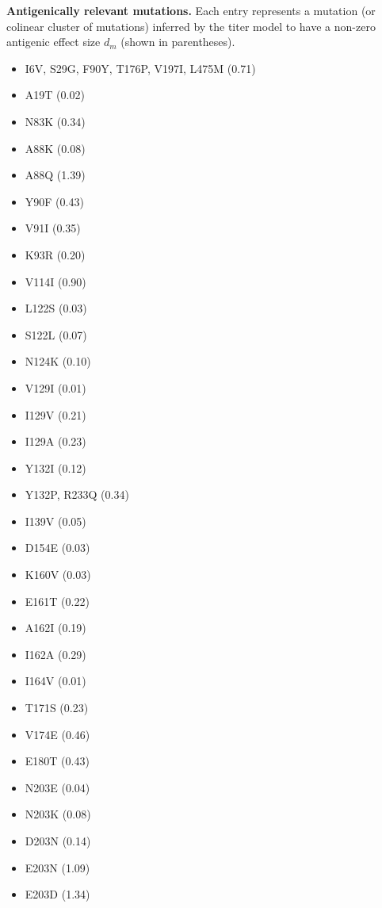 \documentclass[11pt,oneside,letterpaper]{article}
\begin{document}
\begin{table}[ht]
  \centering
  \caption{
    \textbf{Antigenically relevant mutations.}
    Each entry represents a mutation (or colinear cluster of mutations) inferred by the titer model to have a non-zero antigenic effect size $d_m$ (shown in parentheses).
  }
  \label{antigenic_mutations}
  \begin{multicols}{3}
    \begin{itemize}
      \raggedright
      \item I6V, S29G, F90Y, T176P, V197I, L475M (0.71)
      \item A19T (0.02)
      \item N83K (0.34)
      \item A88K (0.08)
      \item A88Q (1.39)
      \item Y90F (0.43)
      \item V91I (0.35)
      \item K93R (0.20)
      \item V114I (0.90)
      \item L122S (0.03)
      \item S122L (0.07)
      \item N124K (0.10)
      \item V129I (0.01)
      \item I129V (0.21)
      \item I129A (0.23)
      \item Y132I (0.12)
      \item Y132P, R233Q (0.34)
      \item I139V (0.05)
      \item D154E (0.03)
      \item K160V (0.03)
      \item E161T (0.22)
      \item A162I (0.19)
      \item I162A (0.29)
      \item I164V (0.01)
      \item T171S (0.23)
      \item V174E (0.46)
      \item E180T (0.43)
      \item N203E (0.04)
      \item N203K (0.08)
      \item D203N (0.14)
      \item E203N (1.09)
      \item E203D (1.34)

\end{itemize}
\end{multicols}
\end{table}
\end{document}
